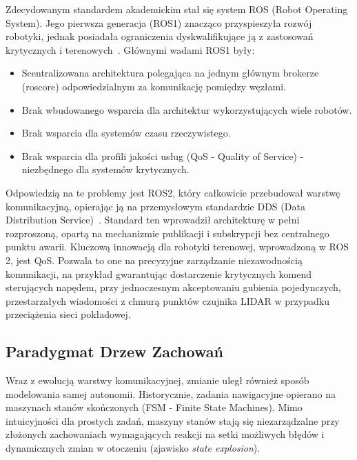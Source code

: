 \documentclass[a4paper,twoside,12pt]{book}
\begin{document}
Zdecydowanym standardem akademickim stał się system ROS (Robot Operating System). Jego pierwsza generacja (ROS1) znacząco przyspieszyła rozwój robotyki, jednak posiadała ograniczenia dyskwalifikujące ją z zastosowań krytycznych i terenowych~\cite{Ros2InNutshell}. Głównymi wadami ROS1 były:
\begin{itemize}
    \item Scentralizowana architektura polegająca na jednym głównym brokerze (roscore) odpowiedzialnym za komunikację pomiędzy węzłami.
    \item Brak wbudowanego wsparcia dla architektur wykorzystujących wiele robotów.
    \item Brak wsparcia dla systemów czasu rzeczywistego.
    \item Brak wsparcia dla profili jakości usług (QoS - Quality of Service) - niezbędnego dla systemów krytycznych.
\end{itemize}

Odpowiedzią na te problemy jest ROS2, który całkowicie przebudował warstwę komunikacyjną, opierając ją na przemysłowym standardzie DDS (Data Distribution Service)~\cite{ros2DDS}. Standard ten wprowadził architekturę w pełni rozproszoną, opartą na mechanizmie publikacji i subskrypcji bez centralnego punktu awarii. Kluczową innowacją dla robotyki terenowej, wprowadzoną w ROS 2, jest QoS. Pozwala to one na precyzyjne zarządzanie niezawodnością komunikacji, na przykład gwarantując dostarczenie krytycznych komend sterujących napędem, przy jednoczesnym akceptowaniu gubienia pojedynczych, przestarzałych wiadomości z chmurą punktów czujnika LIDAR w przypadku przeciążenia sieci pokładowej.

\subsection{Paradygmat Drzew Zachowań}
Wraz z ewolucją warstwy komunikacyjnej, zmianie uległ również sposób modelowania samej autonomii. Historycznie, zadania nawigacyjne opierano na maszynach stanów skończonych (FSM - Finite State Machines). Mimo intuicyjności dla prostych zadań, maszyny stanów stają się niezarządzalne przy złożonych zachowaniach wymagających reakcji na setki możliwych błędów i dynamicznych zmian w otoczeniu (zjawisko \textit{state explosion}).
\end{document}
